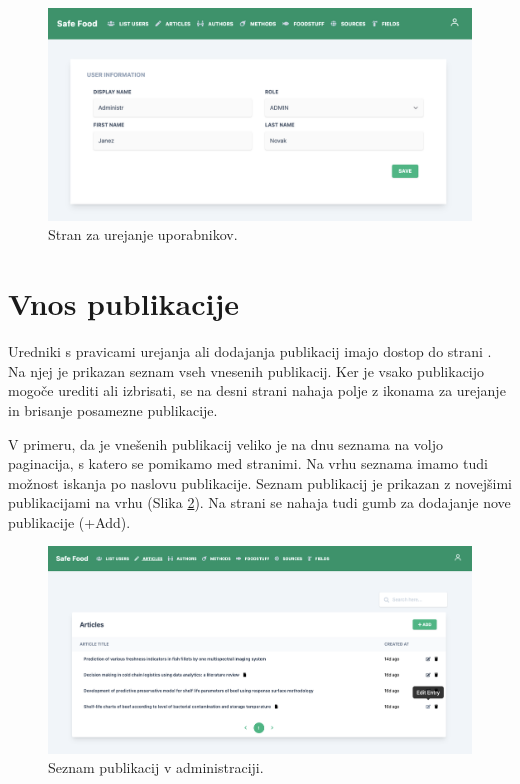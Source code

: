 \documentclass[a4paper, 12pt]{book}
\begin{document}
\begin{figure}[h]
\begin{center}
\includegraphics[width=1\textwidth]{slike/users-edit.png}
\end{center}
\caption{ Stran za urejanje uporabnikov. }
\label{users-edit-page}
\end{figure}


\section{Vnos publikacije}
Uredniki s pravicami urejanja ali dodajanja publikacij imajo dostop do strani . Na njej je prikazan seznam vseh vnesenih publikacij. Ker je vsako publikacijo mogoče urediti ali izbrisati, se na desni strani nahaja polje z ikonama za urejanje in brisanje posamezne publikacije. 

V primeru, da je vnešenih publikacij veliko je na dnu seznama na voljo paginacija, s katero se pomikamo med stranimi. Na vrhu seznama imamo tudi možnost iskanja po naslovu publikacije. Seznam publikacij je prikazan z novejšimi publikacijami na vrhu (Slika \ref{list-articles}). Na strani se nahaja tudi gumb za dodajanje nove publikacije (+Add).

\begin{figure}[h]
\begin{center}
\includegraphics[width=1\textwidth]{slike/list-articles.png}
\end{center}
\caption{ Seznam publikacij v administraciji. }
\label{list-articles}
\end{figure}
\end{document}
